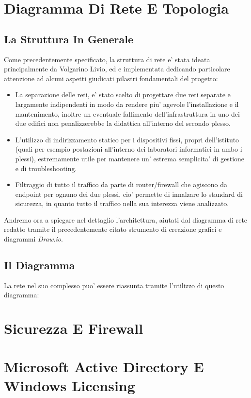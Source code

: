 \documentclass{report}
\begin{document}
    \chapter{Diagramma Di Rete E Topologia}
        \author{Volgarino Livio}
        \section{La Struttura In Generale}
        Come precedentemente specificato, la struttura di rete e' stata ideata principalmente da Volgarino Livio, ed e
         implementata dedicando particolare attenzione ad alcuni aspetti giudicati pilastri fondamentali del progetto:
         \begin{itemize}
             \item La separazione delle reti, e' stato scelto di progettare due reti separate e largamente indipendenti
              in modo da rendere piu' agevole l'installazione e il mantenimento, inoltre un eventuale fallimento
              dell'infrastruttura in uno dei due edifici non penalizzerebbe la didattica all'interno del secondo plesso.
             \item L'utilizzo di indirizzamento statico per i dispositivi fissi, propri dell'istituto (quali per esempio
              postazioni all'interno dei laboratori informatici in ambo i plessi), estremamente utile per mantenere un'
              estrema semplicita' di gestione e di troubleshooting.
             \item Filtraggio di tutto il traffico da parte di router/firewall che agiscono da endpoint per ognuno dei due
              plessi, cio' permette di innalzare lo standard di sicurezza, in quanto tutto il traffico nella sua interezza
              viene analizzato.
         \end{itemize}
        Andremo ora a spiegare nel dettaglio l'architettura, aiutati dal diagramma di rete redatto tramite il precedentemente
         citato strumento di creazione grafici e diagrammi \emph{Draw.io}.
        \section{Il Diagramma}
        La rete nel suo complesso puo' essere riassunta tramite l'utilizzo di questo diagramma:
    \chapter{Sicurezza E Firewall}
        \author{Serena Thomas}
    \chapter{Microsoft Active Directory E Windows Licensing}
        \author{Catone Mario}
\end{document}

